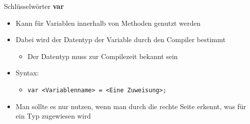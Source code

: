 \begin{frame}{Schlüsselwörter}
	\textbf{var}\\
	\begin{itemize}
		\item Kann für Variablen innerhalb von Methoden genutzt werden
		\item Dabei wird der Datentyp der Variable durch den Compiler bestimmt
		\begin{itemize}
			\item Der Datentyp muss zur Compilezeit bekannt sein
		\end{itemize}
		\item Syntax:
		\begin{itemize}
			\item \texttt{var \alert{<Variablenname>} = \alert{<Eine Zuweisung>};}
		\end{itemize}
		\item Man sollte es nur nutzen, wenn man durch die rechte Seite erkennt, was für ein Typ zugewiesen wird
	\end{itemize}
	
\end{frame}



